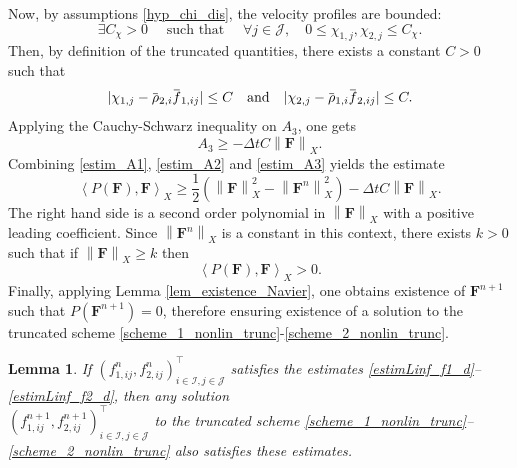 \documentclass[reqno]{amsart}
\newtheorem{Lemma}{Lemma}
\newcommand{\II}{\mathcal{I}}
\newcommand{\J}{\mathcal{J}}
\newcommand{\Fbf}{\mathbf{F}}
\newcommand{\lla}{\left\langle}
\newcommand{\rra}{\right\rangle}
\newcommand{\overbar}[1]{\mkern 1.5mu\overline{\mkern-1.5mu#1\mkern-1.5mu}\mkern 1.5mu}
\numberwithin{equation}{section}
\begin{document}
Now, by assumptions \eqref{hyp_chi_dis}, the velocity profiles are bounded:
\begin{equation*}
    \exists C_\chi>0 \quad\text{ such that }\quad \forall j\in\J, \quad 0\leq \chi_{1,j},\chi_{2,j}\leq C_\chi.
\end{equation*}
Then, by definition of the truncated quantities, there exists a constant $C>0$ such that
\begin{equation*}
    |\chi_{1,j}-\overbar{\rho}_{2,i}\overbar{f}_{1,ij}|\leq C\quad\text{and}\quad |\chi_{2,j}-\overbar{\rho}_{1,i}\overbar{f}_{2,ij}|\leq C.
\end{equation*}
Applying the Cauchy-Schwarz inequality on $A_3$, one gets
\begin{equation}\label{estim_A3}
    A_3\geq -\Delta t C \left\| \Fbf\right\|_X.
\end{equation}
Combining \eqref{estim_A1}, \eqref{estim_A2} and \eqref{estim_A3} yields the estimate
\begin{equation*}
    \lla P(\Fbf), \Fbf \rra_X\geq 
    \frac{1}{2}\left( \left\| \Fbf\right\|_X^2 - \left\| \Fbf^n\right\|_X^2\right) -\Delta t C \left\| \Fbf\right\|_X.
\end{equation*} 
The right hand side is a second order polynomial in $\left\| \Fbf\right\|_X$ with a positive leading coefficient. Since $\left\| \Fbf^n\right\|_X$ is a constant in this context, there exists $k>0$ such that if $\left\| \Fbf\right\|_X\geq k$ then 
\begin{equation*}
    \lla P(\Fbf), \Fbf \rra_X> 0.
\end{equation*} 
Finally, applying Lemma \ref{lem_existence_Navier}, one obtains existence of $\Fbf^{n+1}$ such that $P(\Fbf^{n+1})=0$, therefore ensuring existence of a solution to the truncated scheme \eqref{scheme_1_nonlin_trunc}-\eqref{scheme_2_nonlin_trunc}.

\begin{Lemma}\label{lem_bornes_trunc}
    If  $(f_{1,ij}^n,f_{2,ij}^n)^\top_{i\in\II,j\in\J}$ satisfies the estimates \eqref{estimLinf_f1_d}--\eqref{estimLinf_f2_d}, then any solution\\ $(f_{1,ij}^{n+1},f_{2,ij}^{n+1})^\top_{i\in\II,j\in\J}$ to the truncated scheme \eqref{scheme_1_nonlin_trunc}--\eqref{scheme_2_nonlin_trunc} also satisfies these estimates.
\end{Lemma}
\end{document}
